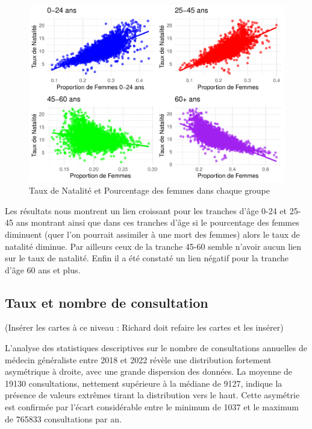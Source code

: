 \documentclass[
]{article}
\begin{document}
\begin{figure}

{\centering \includegraphics{4_Analyse_Descriptive_files/figure-latex/unnamed-chunk-5-1} 

}

\caption{Taux de Natalité et Pourcentage des femmes dans chaque groupe}\label{fig:unnamed-chunk-5}
\end{figure}

Les résultats nous montrent un lien croissant pour les tranches d'âge
0-24 et 25-45 ans montrant ainsi que dans ces tranches d'âge si le
pourcentage des femmes diminuent (quer l'on pourrait assimiler à une
mort des femmes) alors le taux de natalité diminue. Par ailleurs ceux de
la tranche 45-60 semble n'avoir aucun lien sur le taux de natalité.
Enfin il a été constaté un lien négatif pour la tranche d'âge 60 ans et
plus.

\subsection{Taux et nombre de
consultation}\label{taux-et-nombre-de-consultation}

(Insérer les cartes à ce niveau : Richard doit refaire les cartes et les
insérer)

L'analyse des statistiques descriptives sur le nombre de consultations
annuelles de médecin généraliste entre 2018 et 2022 révèle une
distribution fortement asymétrique à droite, avec une grande dispersion
des données. La moyenne de 19130 consultations, nettement supérieure à
la médiane de 9127, indique la présence de valeurs extrêmes tirant la
distribution vers le haut. Cette asymétrie est confirmée par l'écart
considérable entre le minimum de 1037 et le maximum de 765833
consultations par an.
\end{document}
